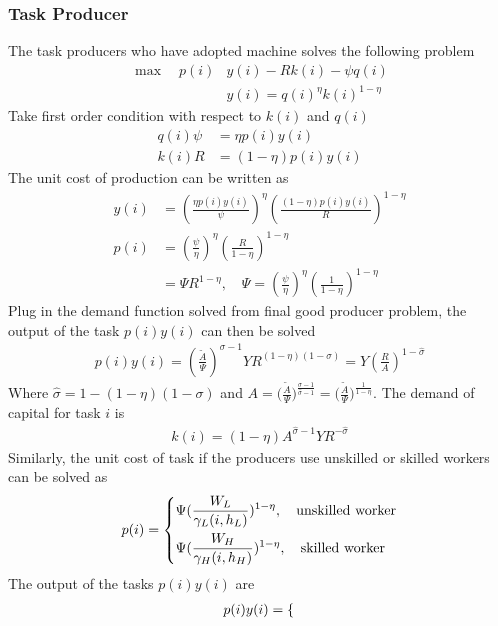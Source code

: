 \documentclass[12pt]{article}
\begin{document}
\begin{appendices}
\subsubsection*{Task Producer}
The task producers who have adopted machine solves the following problem 
\begin{align*}
\max \quad  p(i)&y(i)-Rk(i)-\psi q(i) \\
&y(i) = q(i)^{\eta}k(i)^{1-\eta}
\end{align*}
Take first order condition with respect to $k(i)$ and $q(i)$
\begin{align*}
q(i)\psi &= \eta p(i)y(i) \\
k(i)R &= (1-\eta)p(i)y(i) 
\end{align*}
The unit cost of production can be written as 
\begin{align*}
y(i) &= (\frac{\eta p(i)y(i)}{\psi})^{\eta}(\frac{(1-\eta)p(i)y(i)}{R})^{1-\eta} \\
p(i) &= (\frac{\psi}{\eta})^{\eta} (\frac{R}{1-\eta})^{1-\eta} \\
 	  &= \Psi R^{1-\eta}, \quad \Psi =  (\frac{\psi}{\eta})^{\eta} (\frac{1}{1-\eta})^{1-\eta}
\end{align*}
Plug in the demand function solved from final good producer problem, the output of the task $p(i)y(i)$ can then be solved 
\begin{align*}
p(i)y(i) = (\frac{\tilde{A}}{\Psi})^{\sigma-1}YR^{(1-\eta)(1-\sigma)} = Y(\frac{R}{A})^{1-\hat{\sigma}}
\end{align*}
Where $\hat{\sigma} = 1-(1-\eta)(1-\sigma)$ and $A = \Big(\frac{\tilde{A}}{\Psi}\Big)^{\frac{\sigma-1}{\hat{\sigma}-1}}  = \Big(\frac{\tilde{A}}{\Psi}\Big)^{\frac{1}{1-\eta}}$. 
The demand of capital for task $i$ is 
\begin{align*}
k(i) = (1-\eta)A^{\hat{\sigma}-1}YR^{-\hat{\sigma}}
\end{align*}
Similarly, the unit cost of task if the producers use unskilled or skilled workers can be solved as 
\begin{align*}
p(i) =
\begin{dcases}
\Psi(\frac{W_L}{\gamma_L(i,h_L)})^{1-\eta}, \quad \text{unskilled worker}  \\
\Psi(\frac{W_H}{\gamma_H(i,h_H)})^{1-\eta}, \quad \text{skilled worker}
\end{dcases}
\end{align*}
The output of the tasks $p(i)y(i)$ are
\begin{align*}
p(i)y(i) =
\begin{dcases}

\end{dcases}
\end{align*}
\end{appendices}
\end{document}
